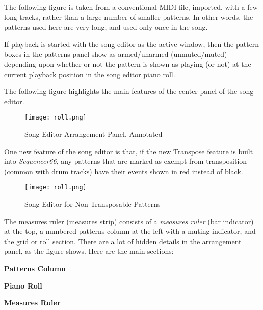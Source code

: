    The following figure is taken from a conventional MIDI file, imported,
   with a few long tracks, rather than a large number of smaller patterns.
   In other words, the patterns used here are very long, and used only once
   in the song.

   If playback is started with the song editor as the
   active window, then the pattern boxes in the patterns panel
   show as armed/unarmed (unmuted/muted) depending upon whether or not the
   pattern is shown as playing (or not) at the current playback position in
   the song editor piano roll.

   The following figure highlights the main features of the center panel of the
   song editor.

\begin{figure}[H]
   \centering 
   \texttt{[image: roll.png]}
   \caption{Song Editor Arrangement Panel, Annotated}
   \label{fig:song_editor_window_full_items}
\end{figure}

   One new feature of the song editor is that, if the new Transpose feature is
   built into \textsl{Sequencer66}, any patterns that are marked as exempt from
   transposition (common with drum tracks) have their events shown in red
   instead of black.

\begin{figure}[H]
   \centering 
   \texttt{[image: roll.png]}
   \caption{Song Editor for Non-Transposable Patterns}
   \label{fig:song_editor_non_transposable_items}
\end{figure}

   The measures ruler (measures strip)
   consists of a \textsl{measures ruler} (bar indicator) at the top, a
   numbered patterns column at the left with a muting indicator, and the
   grid or roll section.  There are a lot of hidden details in the
   arrangement panel, as the figure shows.  Here are the main sections:

   \begin{enumber}
      \item \textbf{Patterns Column}
      \item \textbf{Piano Roll}
      \item \textbf{Measures Ruler}
   \end{enumber}

